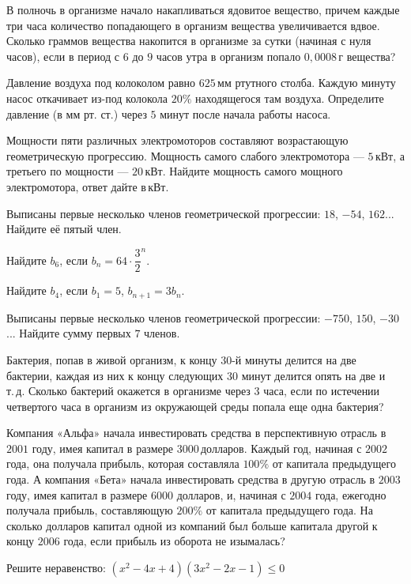 \begin{class}[number=2]
\begin{listofex}
		\item В полночь в организме начало накапливаться ядовитое вещество, причем каждые три часа количество попадающего в организм вещества увеличивается вдвое. Сколько граммов вещества накопится в организме за сутки (начиная с нуля часов), если в период с \( 6 \) до \( 9 \) часов утра в организм попало \( 0,0008 \) г вещества?
		\item Давление воздуха под колоколом равно \( 625 \) мм ртутного столба. Каждую минуту насос откачивает из-под колокола \( 20\% \) находящегося там воздуха. Определите давление (в мм рт. ст.) через \( 5 \) минут после начала работы насоса.
		\item Мощности пяти различных электромоторов составляют возрастающую геометрическую прогрессию. Мощность самого слабого электромотора --- \( 5 \) кВт, а третьего по мощности --- \( 20 \) кВт. Найдите мощность самого мощного электромотора, ответ дайте в кВт.
	\end{listofex}
\end{class}
%
%
\begin{homework}[number=1]
	\begin{listofex}
		\item Выписаны первые несколько членов геометрической прогрессии: \( 18 \), \( -54 \), \( 162 \)... Найдите её пятый член.
		\item Найдите \( b_6 \), \quad если \( b_n=64\cdot\dfrac{3}{2}^n \).
		\item Найдите \( b_4 \), \quad если \( b_1=5	\), \( b_{n+1}=3b_n \).
		\item Выписаны первые несколько членов геометрической прогрессии: \( -750 \), \( 150 \), \( -30 \)... Найдите сумму первых \( 7 \) членов.
		\item Бактерия, попав в живой организм, к концу \( 30 \)-й минуты делится на две бактерии, каждая из них к концу следующих \( 30 \) минут делится опять на две и т. д. Сколько бактерий окажется в организме через \( 3 \) часа, если по истечении четвертого часа в организм из окружающей среды попала еще одна бактерия?
		\item Компания «Альфа» начала инвестировать средства в перспективную отрасль в \( 2001 \) году, имея капитал в размере \( 3000 \) долларов. Каждый год, начиная с \( 2002 \) года, она получала прибыль, которая составляла \( 100\% \) от капитала предыдущего года. А компания «Бета» начала инвестировать средства в другую отрасль в \( 2003 \) году, имея капитал в размере \( 6000 \) долларов, и, начиная с \( 2004 \) года, ежегодно получала прибыль, составляющую \( 200\% \) от капитала предыдущего года. На сколько долларов капитал одной из компаний был больше капитала другой к концу \( 2006 \) года, если прибыль из оборота не изымалась?
		\item Решите неравенство: \quad \( (x^2-4x+4)(3x^2-2x-1)\le0 \)
	\end{listofex}
\end{homework}



